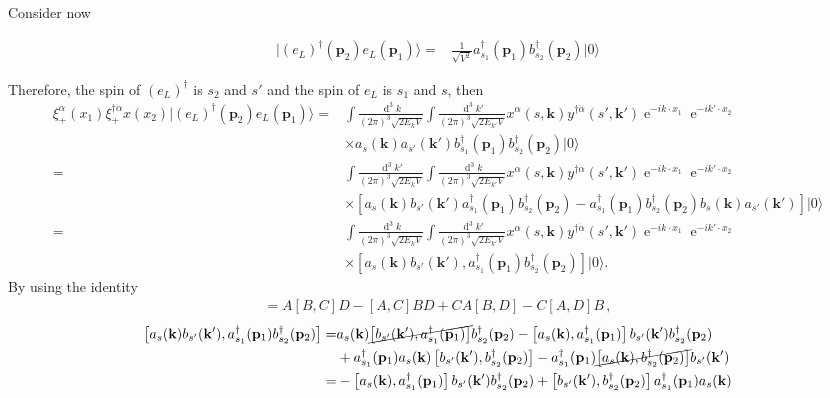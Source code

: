 Consider now



\begin{align}
  |\left( e_L \right)^{\dagger}(\mathbf{p}_2)e_L(\mathbf{p}_1)\rangle=&\frac{1}{\sqrt{V^2}}a_{s_1}^\dagger(\mathbf{p}_1)b_{s_2}^\dagger(\mathbf{p}_2)|0\rangle
\end{align}


Therefore, the spin of $\left(e_L\right)^{\dagger}$ is $s_2$ and $s'$ and the spin of $e_L$ is $s_{1}$ and $s$, then %
\begin{align}
  \xi^\alpha_{+}(x_1)\xi^{\dagger\dot{\alpha}}_{+}x(x_2)|\left(e_L\right)^{\dagger}(\mathbf{p}_2)e_L(\mathbf{p}_1)\rangle=&
\int\frac{\operatorname{d}^3k}{(2\pi)^3\sqrt{2E_k V}}\int\frac{\operatorname{d}^3k'}{(2\pi)^3\sqrt{2E_{k'}V}}
x^\alpha(s,\mathbf{k})y^{\dagger\dot{\alpha}}(s',\mathbf{k}')\operatorname{e}^{-i k\cdot x_1}\operatorname{e}^{-i k'\cdot x_2}\nonumber\\
&\times a_s(\mathbf{k})a_{s'}(\mathbf{k}')b_{s_1}^\dagger(\mathbf{p}_1)b_{s_2}^\dagger(\mathbf{p}_2)|0\rangle \nonumber\\
=&
\int\frac{\operatorname{d}^3k'}{(2\pi)^3\sqrt{2E_k V}}\int\frac{\operatorname{d}^3k}{(2\pi)^3\sqrt{2E_{k'}V}}
x^\alpha(s,\mathbf{k})y^{\dagger\dot{\alpha}}(s',\mathbf{k}')\operatorname{e}^{-i k\cdot x_1}\operatorname{e}^{-i k'\cdot x_2}\nonumber\\
&\times \left[ a_s(\mathbf{k})b_{s'}(\mathbf{k}')a_{s_1}^\dagger(\mathbf{p}_1)b_{s_2}^\dagger(\mathbf{p}_2) - a_{s_1}^\dagger(\mathbf{p}_1)b_{s_2}^\dagger(\mathbf{p}_2) b_s(\mathbf{k})a_{s'}(\mathbf{k}') \right]|0\rangle \nonumber\\
=&
\int\frac{\operatorname{d}^3k}{(2\pi)^3\sqrt{2E_k V}}\int\frac{\operatorname{d}^3k'}{(2\pi)^3\sqrt{2E_{k'}V}}
x^\alpha(s,\mathbf{k})y^{\dagger\dot{\alpha}}(s',\mathbf{k}')\operatorname{e}^{-i k\cdot x_1}\operatorname{e}^{-i k'\cdot x_2}\nonumber\\
&\times \left[ a_s(\mathbf{k})b_{s'}(\mathbf{k}'),a_{s_1}^\dagger(\mathbf{p}_1)b_{s_2}^\dagger(\mathbf{p}_2)\right]|0\rangle.
\end{align}
By using the identity
\begin{align}
  [AB,CD]=A[B,C]D - [A,C]BD
+CA[B, D] - C[A, D]B\,,
\end{align}
\begin{align}
   \left[ a_s(\mathbf{k})b_{s'}(\mathbf{k}'),a_{s_1}^\dagger(\mathbf{p}_1)b_{s_2}^\dagger(\mathbf{p}_2)\right]=&
 a_s(\mathbf{k})\cancel{\left[ b_{s'}(\mathbf{k}'),a_{s_1}^\dagger(\mathbf{p}_1)\right]}b_{s_2}^\dagger(\mathbf{p}_2)
-
 \left[ a_s(\mathbf{k}),a_{s_1}^\dagger(\mathbf{p}_1)\right]b_{s'}(\mathbf{k}')b_{s_2}^\dagger(\mathbf{p}_2) \nonumber\\
& 
+a_{s_1}^\dagger(\mathbf{p}_1)a_s(\mathbf{k})\left[ b_{s'}(\mathbf{k}'),b_{s_2}^\dagger(\mathbf{p}_2)\right]
-
a_{s_1}^\dagger(\mathbf{p}_1) \cancel{\left[ a_s(\mathbf{k}),b_{s_2}^\dagger(\mathbf{p}_2)\right]}b_{s'}(\mathbf{k}') \nonumber\\
=&
-
 \left[ a_s(\mathbf{k}),a_{s_1}^\dagger(\mathbf{p}_1)\right]b_{s'}(\mathbf{k}')b_{s_2}^\dagger(\mathbf{p}_2)  
+\left[ b_{s'}(\mathbf{k}'),b_{s_2}^\dagger(\mathbf{p}_2)\right]a_{s_1}^\dagger(\mathbf{p}_1)a_s(\mathbf{k})
\end{align}

